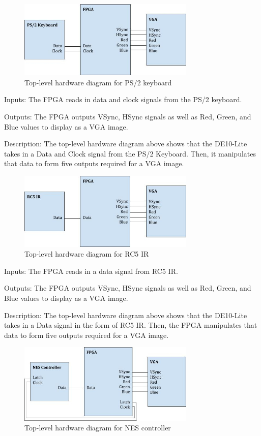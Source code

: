 \documentclass[12pt]{article}
\numberwithin{figure}{subsection}
\begin{document}
\begin{figure}[ht]
  \centering
  \includegraphics[width=0.75\textwidth]{ps2_top_level_block_diagram.jpg}
  \caption{Top-level hardware diagram for PS/2 keyboard}
  \label{fig:ps2_top_level_block_diagram}
\end{figure}

Inputs: The FPGA reads in data and clock signals from the PS/2 keyboard.

Outputs: The FPGA outputs VSync, HSync signals as well as Red, Green, and Blue values to display as a VGA image.

Description: The top-level hardware diagram above shows that the DE10-Lite takes in a Data and Clock signal from the PS/2 Keyboard. Then, it manipulates that data to form five outputs required for a VGA image.

\begin{figure}[ht]
  \centering
  \includegraphics[width=0.75\textwidth]{ir_top_level_block_diagram.jpg}
  \caption{Top-level hardware diagram for RC5 IR}
  \label{fig:ir_top_level_block_diagram}
\end{figure}

Inputs: The FPGA reads in a data signal from RC5 IR.

Outputs: The FPGA outputs VSync, HSync signals as well as Red, Green, and Blue values to display as a VGA image.

Description: The top-level hardware diagram above shows that the DE10-Lite takes in a Data signal in the form of RC5 IR. Then, the FPGA manipulates that data to form five outputs required for a VGA image.

\begin{figure}[ht]
  \centering
  \includegraphics[width=0.75\textwidth]{nes_top_level_block_diagram.jpg}
  \caption{Top-level hardware diagram for NES controller}
  \label{fig:nes_top_level_block_diagram}
\end{figure}
\end{document}
